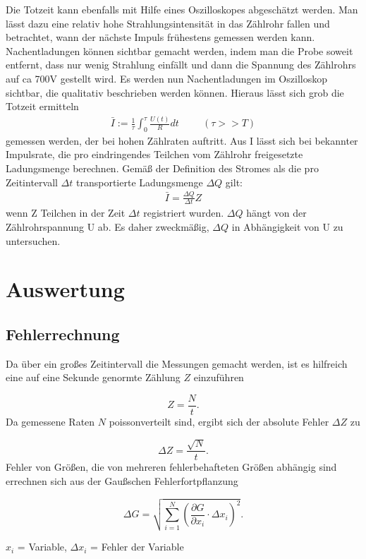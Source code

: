 Die Totzeit kann ebenfalls mit Hilfe eines Oszilloskopes abgeschätzt werden. Man lässt dazu eine relativ hohe Strahlungsintensität in das Zählrohr fallen und betrachtet, wann der nächste Impuls frühestens gemessen werden kann.
Nachentladungen können sichtbar gemacht werden, indem man die Probe soweit entfernt, dass nur wenig Strahlung einfällt und dann die
Spannung des Zählrohrs auf ca 700V gestellt wird. Es werden nun Nachentladungen im Oszilloskop sichtbar, die qualitativ beschrieben
werden können. Hieraus lässt sich grob die Totzeit ermitteln
\begin{align}
\bar{I}:= \frac{1}{\tau} \int_0^\tau \frac{U(t)}{R}dt \hspace{1cm} (\tau >> T)
\end{align}
gemessen werden, der bei hohen Zählraten auftritt. Aus I lässt sich bei bekannter Impulsrate, die pro eindringendes Teilchen vom Zählrohr freigesetzte Ladungsmenge berechnen. Gemäß der Definition des Stromes als die pro Zeitintervall $\Delta t$ transportierte Ladungsmenge $\Delta Q$ gilt:
\begin{align}
\bar{I} = \frac{\Delta Q}{\Delta t} Z
\end{align}
wenn Z Teilchen in der Zeit $\Delta t$ registriert wurden.
$\Delta Q$ hängt von der Zählrohrspannung U ab. Es daher zweckmäßig, $\Delta Q$ in Abhängigkeit von U zu untersuchen.


\section{Auswertung}
\subsection{Fehlerrechnung}
Da über ein großes Zeitintervall die Messungen gemacht werden, ist es hilfreich eine auf eine Sekunde genormte Zählung $Z$ einzuführen

\begin{equation}
 Z = \frac{N}{t}.
\end{equation}
Da gemessene Raten $N$ poissonverteilt sind, ergibt sich der absolute Fehler $\Delta Z$ zu

\begin{equation}
 \Delta Z = \frac{\sqrt{N}}{t}.
\end{equation}
Fehler von Größen, die von mehreren fehlerbehafteten Größen abhängig sind errechnen sich aus der Gaußschen Fehlerfortpflanzung

\begin{formel}[H]
\begin{equation}
\Delta G = \sqrt{\sum_{i=1}^{N}\left( \frac{\partial G}{\partial x_i}\cdot \Delta x_i\right)^2}.
\label{eq_gauss}
\end{equation}
\caption*{\small{$x_i$ = Variable, $\Delta x_i$ = Fehler der Variable}}
\end{formel}

